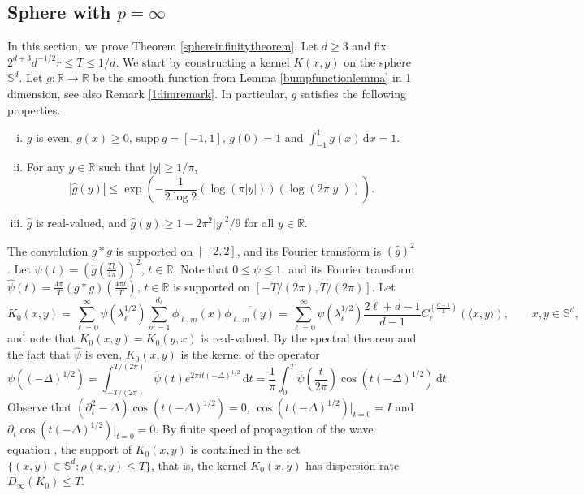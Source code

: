 \documentclass[11pt,a4paper]{article}
\theoremstyle{definition}
\begin{document}
\subsection{Sphere with $p=\infty$}

In this section, we prove Theorem \ref{sphereinfinitytheorem}. Let $d \ge 3$ and fix $2^{d+3} d^{-1/2} r \le T \le 1/d$. We start by constructing a kernel $K(x,y)$ on the sphere $\mathbb{S}^d$. Let $g: \mathbb{R} \to \mathbb{R}$ be the smooth function from Lemma \ref{bumpfunctionlemma} in 1 dimension, see also Remark \ref{1dimremark}. In particular, $g$ satisfies the following properties.
\begin{enumerate}[(i)]
\item \label{propi} $g$ is even, $g(x) \ge 0$, $\mathrm{supp} \, g = [-1,1]$, $g(0)=1$ and $\int_{-1}^1 g(x) \, \mathrm{d}x =1$.

\item \label{propii} For any $y \in \mathbb{R}$ such that $|y| \ge 1/\pi$,
\[ |\widehat{g}(y)| \le \exp \left( - \frac{1}{2 \log 2} \left( \log (\pi |y|) \right) \left( \log (2 \pi |y|) \right) \right) . \]

\item \label{propiii} $\widehat{g}$ is real-valued, and $\widehat{g}(y) \ge 1-2 \pi^2 |y|^2 /9$ for all $y \in \mathbb{R}$.
\end{enumerate}

The convolution $g*g$ is supported on $[-2,2]$, and its Fourier transform is $(\widehat{g})^2$. Let $\psi (t) = (\widehat{g}(\frac{Tt}{4 \pi}))^2$, $t \in \mathbb{R}$. Note that $0 \le \psi \le 1$, and its Fourier transform $\widehat{\psi}(t)=\frac{4\pi}{T} (g*g)(\frac{4 \pi t}{T})$, $t \in \mathbb{R}$ is supported on $[-T/(2 \pi),T/(2 \pi)]$. Let
\[ K_0 (x,y) = \sum_{\ell=0}^{\infty} \psi (\lambda_{\ell}^{1/2}) \sum_{m=1}^{d_{\ell}} \phi_{\ell,m}(x) \overline{\phi_{\ell,m}(y)} = \sum_{\ell=0}^{\infty} \psi (\lambda_{\ell}^{1/2}) \frac{2 \ell +d-1}{d-1} C_{\ell}^{(\frac{d-1}{2})}(\langle x, y \rangle), \qquad x, y \in \mathbb{S}^d , \]
and note that $K_0(x,y)=K_0(y,x)$ is real-valued. By the spectral theorem and the fact that $\widehat{\psi}$ is even, $K_0(x,y)$ is the kernel of the operator
\[ \psi ((-\Delta)^{1/2}) = \int_{-T/(2 \pi)}^{T/(2 \pi)} \widehat{\psi}(t) e^{2 \pi i t (-\Delta)^{1/2}} \, \mathrm{d}t = \frac{1}{\pi} \int_0^T \widehat{\psi} \left( \frac{t}{2 \pi} \right) \cos (t (-\Delta)^{1/2}) \, \mathrm{d}t . \]
Observe that $(\partial_t^2 - \Delta) \cos (t (-\Delta)^{1/2}) = 0$, $\cos (t (-\Delta)^{1/2})|_{t=0}=I$ and $\partial_t \cos (t (-\Delta)^{1/2})|_{t=0}=0$. By finite speed of propagation of the wave equation \cite[Theorem 2.4.2]{SO}, the support of $K_0(x,y)$ is contained in the set $\{ (x,y) \in \mathbb{S}^d : \rho (x,y) \le T \}$, that is, the kernel $K_0 (x,y)$ has dispersion rate $D_{\infty}(K_0) \le T$.
\end{document}
